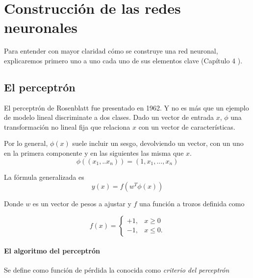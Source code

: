 %

\chapter{Construcción de las redes neuronales}  
Para entender con mayor claridad cómo se construye una red neuronal, explicaremos primero 
uno a uno cada uno de sus elementos clave 
(Capítulo 4 \cite{BishopPaterRecognition}).

\section{El perceptrón}  

El perceptrón de Rosenblatt fue presentado en 1962. 
Y no es más que un ejemplo de modelo lineal 
discriminate a dos clases.
Dado un vector de entrada $x$, 
$\phi$ una transformación no lineal fija que relaciona
$x$ con un vector de características. 

Por lo general, $\phi(x)$ suele incluir un sesgo, 
devolviendo un vector, con un uno en la primera componente y en las siguientes las misma que $x$. 
\begin{equation}
    \phi((x_1,..x_n)) = (1, x_1, ..., x_n)
\end{equation} 

La fórmula generalizada es 
\begin{equation}
    y(x) = f(w^T \phi(x))
\end{equation}

Donde $w$ es un vector de pesos a ajustar y 
$f$ una función a trozos definida como 

\begin{equation}
    f(x) =
    \left\{ 
        \begin{aligned}
        +1, & x \geq 0
            \\
            -1, & x \leq 0.
        \end{aligned}
    \right .  
\end{equation}

\subsubsection{El algoritmo del perceptrón}

Se define como función de pérdida la conocida como 
\textit{criterio del perceptrón}

